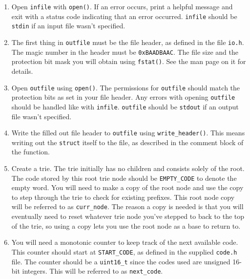 \documentclass{article}
\begin{document}
\begin{enumerate}
    \item Open \texttt{infile} with \texttt{open()}. If an error occurs,
      print a helpful message and exit with a status code indicating
      that an error occurred. \texttt{infile} should be \texttt{stdin}
      if an input file wasn't specified.

    \item The first thing in \texttt{outfile} must be the file header,
      as defined in the file \texttt{io.h}. The magic number in the
      header must be \texttt{0xBAADBAAC}. The file size and the
      protection bit mask you will obtain using \texttt{fstat()}. See
      the man page on it for details.

    \item Open \texttt{outfile} using \texttt{open()}. The permissions
      for \texttt{outfile} should match the protection bits as set in
      your file header. Any errors with opening \texttt{outfile} should
      be handled like with \texttt{infile}. \texttt{outfile} should be
      \texttt{stdout} if an output file wasn't specified.

    \item Write the filled out file header to \texttt{outfile} using
        \texttt{write\_header()}. This means writing out the \texttt{struct}
        itself to the file, as described in the comment block of the function.

    \item Create a trie. The trie initially has no children and consists
      solely of the root. The code stored by this root trie node should
      be \texttt{EMPTY\_CODE} to denote the empty word. You will need to
      make a copy of the root node and use the copy to step through the
      trie to check for existing prefixes. This root node copy will be
      referred to as \texttt{curr\_node}. The reason a copy is needed is
      that you will eventually need to reset whatever trie node you've
      stepped to back to the top of the trie, so using a copy lets you
      use the root node as a base to return to.

    \item You will need a monotonic counter to keep track of the next
      available code. This counter should start at \texttt{START\_CODE},
      as defined in the supplied \texttt{code.h} file. The counter
      should be a \texttt{uint16\_t} since the codes used are unsigned
      16-bit integers.  This will be referred to as \texttt{next\_code}.


\end{enumerate}
\end{document}
